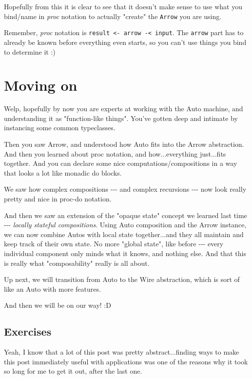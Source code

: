 \documentclass[]{article}
\begin{document}
Hopefully from this it is clear to see that it doesn't make sense to use what
you bind/name in \emph{proc} notation to actually "create" the \texttt{Arrow}
you are using.

Remember, \emph{proc} notation is
\texttt{result\ \textless{}-\ arrow\ -\textless{}\ input}. The \texttt{arrow}
part has to already be known before everything even starts, so you can't use
things you bind to determine it :)

\section{Moving on}

Welp, hopefully by now you are experts at working with the Auto machine, and
understanding it as "function-like things". You've gotten deep and intimate by
instancing some common typeclasses.

Then you saw Arrow, and understood how Auto fits into the Arrow abstraction. And
then you learned about proc notation, and how...everything just...fits together.
And you can declare some nice computations/compositions in a way that looks a
lot like monadic do blocks.

We saw how complex compositions -\/-\/- and complex recursions -\/-\/- now look
really pretty and nice in proc-do notation.

And then we saw an extension of the "opaque state" concept we learned last time
-\/-\/- \emph{locally stateful compositions}. Using Auto composition and the
Arrow instance, we can now combine Autos with local state together...and they
all maintain and keep track of their own state. No more "global state", like
before -\/-\/- every individual component only minds what it knows, and nothing
else. And that this is really what "composability" really is all about.

Up next, we will transition from Auto to the Wire abstraction, which is sort of
like an Auto with more features.

And then we will be on our way! :D

\subsection{Exercises}

Yeah, I know that a lot of this post was pretty abstract...finding ways to make
this post immediately useful with applications was one of the reasons why it
took so long for me to get it out, after the last one.
\end{document}
